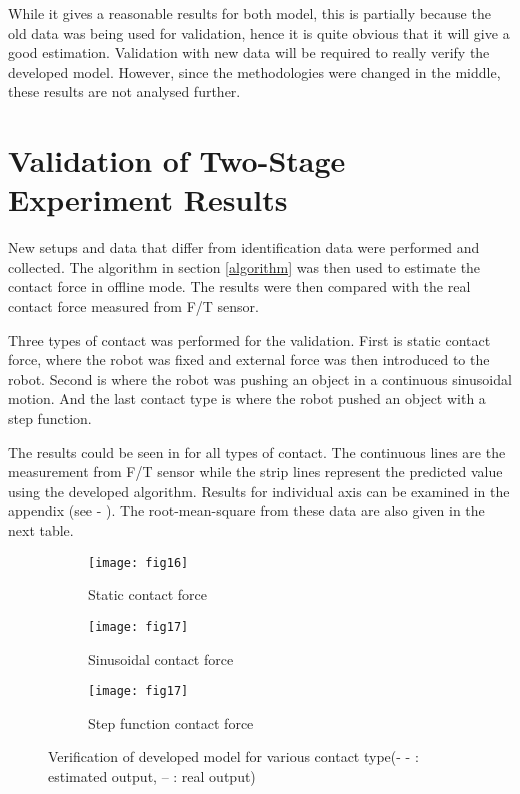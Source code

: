 While it gives a reasonable results for both model, this is partially because the old data was being used for validation, hence it is quite obvious that it will give a good estimation. Validation with new data will be required to really verify the developed model. However, since the methodologies were changed in the middle, these results are not analysed further.


\section{Validation of Two-Stage Experiment Results}

New setups and data that differ from identification data were performed and collected. The algorithm in section \ref{algorithm} was then used to estimate the contact force in offline mode. The results were then compared with the real contact force measured from F/T sensor. 

Three types of contact was performed for the validation. First is static contact force, where the robot was fixed and external force was then introduced to the robot. Second is where the robot was pushing an object in a continuous sinusoidal motion. And the last contact type is where the robot pushed an object with a step function.  

The results could be seen in  for all types of contact. The continuous lines are the measurement from F/T sensor while the strip lines represent the predicted value using the developed algorithm. Results for individual axis can be examined in the appendix (see  - ). The root-mean-square from these data are also given in the next table.

\begin{figure}[H]
  \begin{subfigure}[t]{0.5\textwidth}
    \centering
    \texttt{[image: fig16]} 
    \caption{Static contact force}
  \end{subfigure}
  \begin{subfigure}[t]{0.5\textwidth}
    \centering
    \texttt{[image: fig17]}
    \caption{Sinusoidal contact force}
  \end{subfigure}
  \begin{subfigure}[t]{0.5\textwidth}
    \centering
    \texttt{[image: fig17]}
    \caption{Step function contact force}
  \end{subfigure}
  \caption{Verification of developed model for various contact type(- - : estimated output, -- : real output)}
  \label{fig:force validation 2}
\end{figure}

